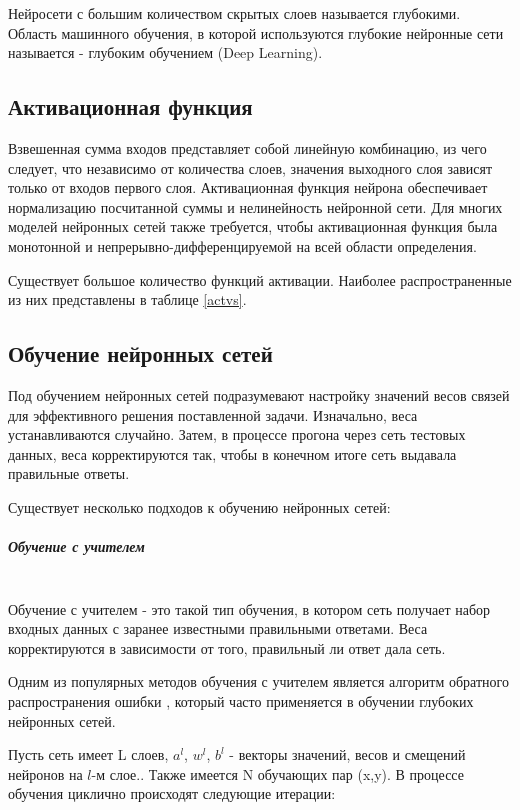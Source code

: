Нейросети с большим количеством скрытых слоев называется глубокими. Область машинного обучения, в которой используются глубокие нейронные сети называется - глубоким обучением (Deep Learning).     

\subsection{Активационная функция}
\label{sec:activation}
Взвешенная сумма входов представляет собой линейную комбинацию, из чего следует, что независимо от количества слоев, значения выходного слоя зависят только от входов первого слоя. 
Активационная функция нейрона обеспечивает нормализацию посчитанной суммы и нелинейность нейронной сети. Для многих моделей нейронных сетей также требуется, чтобы активационная функция была монотонной и непрерывно-дифференцируемой на всей области определения.

Существует большое количество функций активации. Наиболее распространенные из них представлены в таблице \ref{actvs}.



\subsection{Обучение нейронных сетей}
Под обучением нейронных сетей подразумевают настройку значений весов связей для эффективного решения поставленной задачи. Изначально, веса устанавливаются случайно. Затем, в процессе прогона через сеть тестовых данных, веса корректируются так, чтобы в конечном итоге сеть выдавала правильные ответы. 

Существует несколько подходов к обучению нейронных сетей:

\subparagraph{Обучение с учителем} \mbox{} \\
Обучение с учителем - это такой тип обучения, в котором сеть получает набор входных данных с заранее известными правильными ответами. Веса корректируются в зависимости от того, правильный ли ответ дала сеть. 

Одним из популярных методов обучения с учителем является алгоритм обратного распространения ошибки \cite{Nielsen2015}, который часто применяется в обучении глубоких нейронных сетей. 

Пусть сеть имеет L слоев, $a^l$, $w_{}^l$, $b^l$ - векторы значений, весов и смещений нейронов на $l$-м слое.. Также имеется N обучающих пар (x,y). 
В процессе обучения циклично происходят следующие итерации: 

